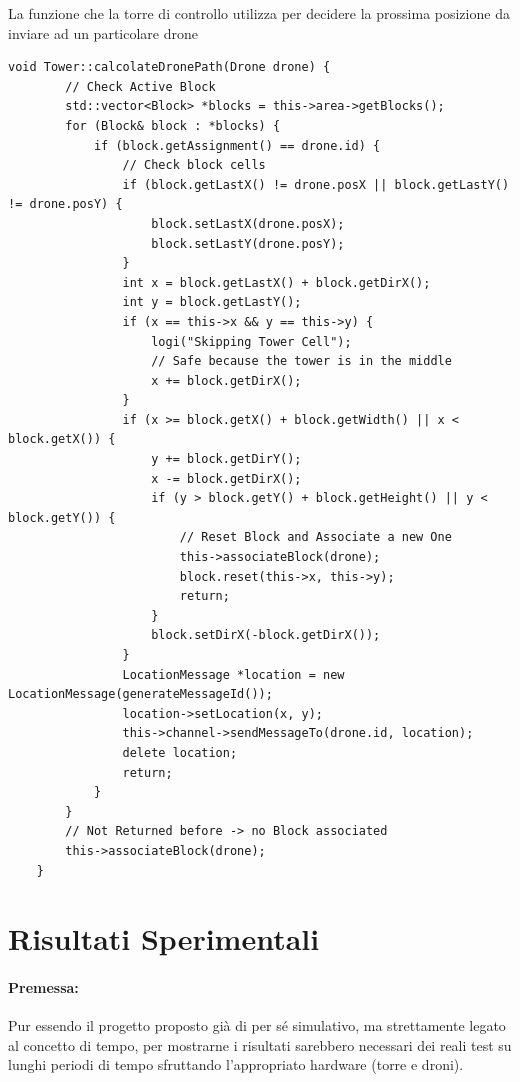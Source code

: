 \documentclass[a4paper, 11pt]{article}
\begin{document}
La funzione che la torre di controllo utilizza per decidere la prossima posizione da inviare ad un particolare drone
\begin{lstlisting}[style=customcpp, caption={da tower.cpp}]
    void Tower::calcolateDronePath(Drone drone) {
        // Check Active Block
        std::vector<Block> *blocks = this->area->getBlocks();
        for (Block& block : *blocks) {
            if (block.getAssignment() == drone.id) {
                // Check block cells
                if (block.getLastX() != drone.posX || block.getLastY() != drone.posY) {
                    block.setLastX(drone.posX);
                    block.setLastY(drone.posY);
                }
                int x = block.getLastX() + block.getDirX();
                int y = block.getLastY();
                if (x == this->x && y == this->y) {
                    logi("Skipping Tower Cell");
                    // Safe because the tower is in the middle
                    x += block.getDirX();
                }
                if (x >= block.getX() + block.getWidth() || x < block.getX()) {
                    y += block.getDirY();
                    x -= block.getDirX();
                    if (y > block.getY() + block.getHeight() || y < block.getY()) {
                        // Reset Block and Associate a new One
                        this->associateBlock(drone);
                        block.reset(this->x, this->y);
                        return;
                    }
                    block.setDirX(-block.getDirX());
                }
                LocationMessage *location = new LocationMessage(generateMessageId());
                location->setLocation(x, y);
                this->channel->sendMessageTo(drone.id, location);
                delete location; 
                return;
            }
        }
        // Not Returned before -> no Block associated
        this->associateBlock(drone);
    }
\end{lstlisting}
\section{Risultati Sperimentali}
\paragraph*{Premessa:} Pur essendo il progetto proposto già di per sé simulativo, ma strettamente legato al concetto di tempo, per mostrarne i risultati sarebbero necessari dei reali test su lunghi periodi di tempo sfruttando l'appropriato hardware (torre e droni).
\end{document}
